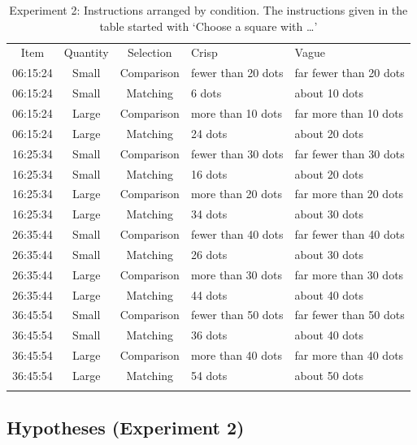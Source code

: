 \documentclass[ %
  graybox       %
 ,envcountchap  %
 ,sectrefs      %
]{svmono}
\begin{document}
\begin{table}
\centering
\caption{Experiment 2: Instructions arranged by condition. The instructions given in the table started with `Choose a square with \ldots'}
\label{Instructions for e2}
\begin{tabular}{cccll}
\hline\noalign{\smallskip}
Item & Quantity & Selection & Crisp & Vague \\
\noalign{\smallskip}\hline\noalign{\smallskip}
06:15:24 & Small & Comparison & fewer than 20 dots & far fewer than 20 dots \\
06:15:24 & Small & Matching & 6 dots & about 10 dots \\
06:15:24 & Large & Comparison & more than 10 dots & far more than 10 dots \\
06:15:24 & Large & Matching & 24 dots & about 20 dots \\
\noalign{\smallskip}\hline\noalign{\smallskip}
16:25:34 & Small & Comparison & fewer than 30 dots & far fewer than 30 dots \\
16:25:34 & Small & Matching & 16 dots & about 20 dots \\
16:25:34 & Large & Comparison & more than 20 dots & far more than 20 dots \\
16:25:34 & Large & Matching & 34 dots & about 30 dots \\
\noalign{\smallskip}\hline\noalign{\smallskip}
26:35:44 & Small & Comparison & fewer than 40 dots & far fewer than 40 dots \\
26:35:44 & Small & Matching & 26 dots & about 30 dots \\
26:35:44 & Large & Comparison & more than 30 dots & far more than 30 dots \\
26:35:44 & Large & Matching & 44 dots & about 40 dots \\
\noalign{\smallskip}\hline\noalign{\smallskip}
36:45:54 & Small & Comparison & fewer than 50 dots & far fewer than 50 dots \\
36:45:54 & Small & Matching & 36 dots & about 40 dots \\
36:45:54 & Large & Comparison & more than 40 dots & far more than 40 dots \\
36:45:54 & Large & Matching & 54 dots & about 50 dots \\
\noalign{\smallskip}\hline
\end{tabular}
\end{table}

\subsection{Hypotheses (Experiment 2)}
\end{document}
